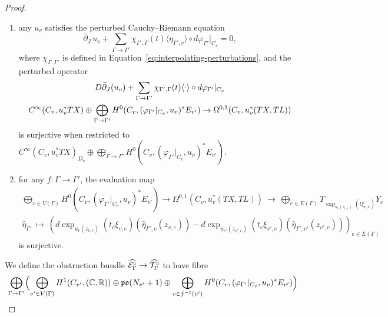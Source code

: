 \documentclass[11pt,psamsfonts, oneside, reqno]{amsart}
\newcommand{\s}[2]{\sum\limits_{#1}{#2} }
\newcommand{\g}{\circ}%
\newcommand{\inv}{^{-1}}
\newcommand{\cl}{\colon}
\newcommand{\lbr}[1]{\Bigl(#1\Bigr)}
\newcommand{\lspan}[1]{\langle {#1}\rangle}
\newcommand{\delbar}{\bar\partial}
\newcommand{\bC}{\mathbb{C}}
\newcommand{\bR}{\mathbb{R}}
\newcommand{\cE}{\mathcal{E}}
\newcommand{\cT}{\mathcal{T}}
\newcommand{\fo}{\mathfrak{o}}
\newcommand{\fp}{\mathfrak{p}}
\newcommand{\wh}{\widehat}
\newcommand{\scale}[2]{\scaleobj{#2}{#1}}
\newcommand{\cEc}{\cE^{\scale{\square}{0.6}}}
\newcommand{\cTc}{\cT^{\scale{\square}{0.6}}}
\theoremstyle{definition}
\theoremstyle{remark}
\numberwithin{equation}{section}
\begin{document}
\begin{proof}
\begin{enumerate}[label=\roman*),leftmargin=23pt,ref=\roman*]
\begin{equation*}
 		\exp_{u_v(z_{v,e})}(t_e\xi_{v,e}) = \exp_{u_{v'}(z_{v',e})}(t_e\xi_{v',e})
 	\end{equation*}
 	and
 	\begin{equation}
 		\label{eq:almost-agreeing-perturbation} 
 		d\exp_{u_v(z_{v,e})}(t_e\xi_{v,e})\g\eta_{\Gamma',v}(z_{v,e}) = d\exp_{u_{v'}(z_{v',e})}(t_e\xi_{v',e})\g\eta_{\Gamma',v'}(z_{v',e})
 	\end{equation}
 	\item any $u_v$ satisfies the perturbed Cauchy--Riemann equation 
 	\begin{equation}\label{eq:cubical-perturbation} 
 		\delbar_J\, u_v + \s{\Gamma\to \Gamma'}{\chi_{\Gamma',\Gamma}(t)\lspan{\eta_{\Gamma',v}}\g d\varphi_{\Gamma'}|_{C_v}} = 0,
 	\end{equation}
 	 where $\chi_{\Gamma,\Gamma'}$ is defined in Equation~\eqref{eq:interpolating-perturbations}, and the perturbed operator
 	 \begin{gather*}\label{eq:perturbed-enhanced-cob} 
 	 	\notag D\delbar_J(u_v) + \s{\Gamma\to \Gamma'}{\chi_{\Gamma',\Gamma}(t)\lspan{\cdot}\g d\varphi_{\Gamma'}|_{C_v}}\\ 
 	 	 C^\infty(C_v,u_v^*TX)\oplus \bigoplus\limits_{\Gamma\to \Gamma'}H^0(C_v,(\varphi_{\Gamma'}|_{C_v},u_v)^*E_{v'}) \to \Omega^{0,1}(C_v,u_v^*(TX,TL))
 	 \end{gather*}
  is surjective when restricted to $C^\infty(C_v,u_v^*TX)_{D_v} \oplus \bigoplus\limits_{\Gamma\to \Gamma'}H^0(C_v,(\varphi_{\Gamma'}|_{C_v},u_v)^*E_{v'})$.
  \item for any $f\cl \Gamma\to \Gamma'$, the evaluation map 
  \begin{gather*}\label{} 
  	\bigoplus\limits_{v\in V(\Gamma)}H^0(C_v,(\varphi_{\Gamma'}|_{C_v},u_v)^*E_{v'}) \to \Omega^{0,1}(C_v,u_v^*(TX,TL)) \ \to\ \bigoplus\limits_{e\in E(\Gamma)}T_{\exp_{u_v(z_{v,e})}(t\xi_{v,e})}Y_e\\
  	\wh\eta_{\Gamma'} \ \mapsto \ (d\exp_{u_v(z_{v,e})}(t_e\xi_{v,e})(\wh\eta_{\Gamma',v}(z_{v,e})) - d\exp_{u_{v'}(z_{v',e})}(t_e\xi_{v',e})(\wh\eta_{\Gamma',v'}(z_{v',e})))_{e\in E(\Gamma)}
  \end{gather*}
is surjective.\end{enumerate} 
We define the obstruction bundle $\wh{\cEc_\Gamma}\to \wh{\cTc_\Gamma}$ to have fibre
\begin{equation*}
	\label{eq:fibre-obstruction-cubical-cobordism-enhanced}
	 \bigoplus\limits_{\Gamma\to \Gamma'}\lbr{\bigoplus\limits_{v'\in V(\Gamma)}H^1(C_{v'},(\bC,\bR))\oplus \fp\fo(N_{v'} +1)\oplus \bigoplus\limits_{v\in f\inv(v')}H^0(C_v,(\varphi_{\Gamma'}|_{C_v},u_v)^*E_{v'})}

\end{equation*}
\end{proof}
\end{document}
